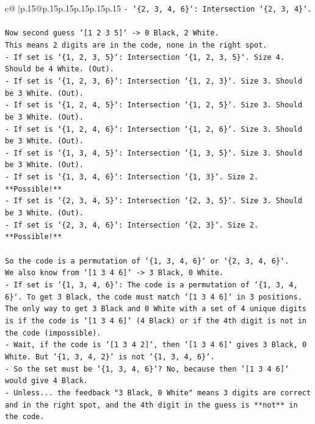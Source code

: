 \documentclass{article}
\begin{document}
{\begin{supertabular}{c@{$\;$}|p{.15\linewidth}@{}p{.15\linewidth}p{.15\linewidth}p{.15\linewidth}p{.15\linewidth}p{.15\linewidth}}
{{{\texttt{{-} `\{2, 3, 4, 6\}`: Intersection `\{2, 3, 4\}`.} \\
\\ 
\texttt{Now second guess `{[}1 2 3 5{]}` {-}> 0 Black, 2 White.} \\
\texttt{This means 2 digits are in the code, none in the right spot.} \\
\texttt{{-} If set is `\{1, 2, 3, 5\}`: Intersection `\{1, 2, 3, 5\}`. Size 4. Should be 4 White. (Out).} \\
\texttt{{-} If set is `\{1, 2, 3, 6\}`: Intersection `\{1, 2, 3\}`. Size 3. Should be 3 White. (Out).} \\
\texttt{{-} If set is `\{1, 2, 4, 5\}`: Intersection `\{1, 2, 5\}`. Size 3. Should be 3 White. (Out).} \\
\texttt{{-} If set is `\{1, 2, 4, 6\}`: Intersection `\{1, 2, 6\}`. Size 3. Should be 3 White. (Out).} \\
\texttt{{-} If set is `\{1, 3, 4, 5\}`: Intersection `\{1, 3, 5\}`. Size 3. Should be 3 White. (Out).} \\
\texttt{{-} If set is `\{1, 3, 4, 6\}`: Intersection `\{1, 3\}`. Size 2. **Possible!**} \\
\texttt{{-} If set is `\{2, 3, 4, 5\}`: Intersection `\{2, 3, 5\}`. Size 3. Should be 3 White. (Out).} \\
\texttt{{-} If set is `\{2, 3, 4, 6\}`: Intersection `\{2, 3\}`. Size 2. **Possible!**} \\
\\ 
\texttt{So the code is a permutation of `\{1, 3, 4, 6\}` or `\{2, 3, 4, 6\}`.} \\
\texttt{We also know from `{[}1 3 4 6{]}` {-}> 3 Black, 0 White.} \\
\texttt{{-} If set is `\{1, 3, 4, 6\}`: The code is a permutation of `\{1, 3, 4, 6\}`. To get 3 Black, the code must match `{[}1 3 4 6{]}` in 3 positions. The only way to get 3 Black and 0 White with a set of 4 unique digits is if the code is `{[}1 3 4 6{]}` (4 Black) or if the 4th digit is not in the code (impossible).} \\
\texttt{{-} Wait, if the code is `{[}1 3 4 2{]}`, then `{[}1 3 4 6{]}` gives 3 Black, 0 White. But `\{1, 3, 4, 2\}` is not `\{1, 3, 4, 6\}`.} \\
\texttt{{-} So the set must be `\{1, 3, 4, 6\}`? No, because then `{[}1 3 4 6{]}` would give 4 Black.} \\
\texttt{{-} Unless... the feedback "3 Black, 0 White" means 3 digits are correct and in the right spot, and the 4th digit in the guess is **not** in the code.} \\
}}}
\end{supertabular}}
\end{document}
